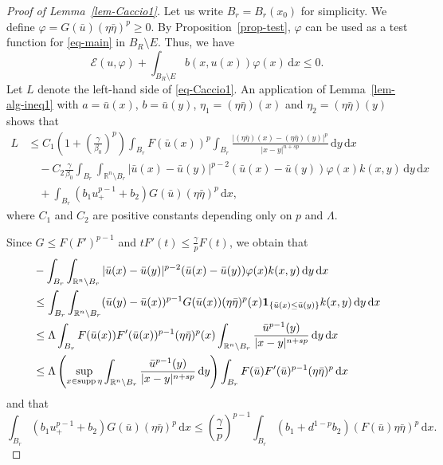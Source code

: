 \documentclass[11pt]{amsart}
\theoremstyle{plain}
\theoremstyle{definition}
\numberwithin{equation}{section}
\begin{document}
\begin{proof}[Proof of Lemma~\ref{lem-Caccio1}]
Let us write $B_r=B_r(x_0)$ for simplicity. We define $\varphi=G(\bar{u}) (\eta\bar{\eta})^p \geq 0$. 
By Proposition~\ref{prop-test}, $\varphi$ can be used as a test function for \eqref{eq-main} in $B_R \setminus E$. Thus, we have
\begin{equation*}
\mathcal{E}(u, \varphi) + \int_{B_R \setminus E} b(x, u(x)) \varphi(x) \,\mathrm{d}x \leq 0.
\end{equation*}
Let $L$ denote the left-hand side of \eqref{eq-Caccio1}. An application of Lemma~\ref{lem-alg-ineq1} with $a=\bar{u}(x)$, $b=\bar{u}(y)$, $\eta_1=(\eta\bar{\eta})(x)$ and $\eta_2=(\eta\bar{\eta})(y)$ shows that
\begin{equation*}
\begin{split}
L
&\leq C_1 \left( 1+\left( \frac{\gamma}{\beta_0} \right)^p \right) \int_{B_r} F(\bar{u}(x))^p \int_{B_r} \frac{|(\eta\bar{\eta})(x)-(\eta\bar{\eta})(y)|^p}{|x-y|^{n+sp}} \,\mathrm{d}y\,\mathrm{d}x \\
&\quad - C_2 \frac{\gamma}{\beta_0} \int_{B_r} \int_{\mathbb{R}^n \setminus B_r} |\bar{u}(x)-\bar{u}(y)|^{p-2} (\bar{u}(x)-\bar{u}(y)) \varphi(x) k(x, y) \,\mathrm{d}y \,\mathrm{d}x \\
&\quad + \int_{B_r} (b_1u_+^{p-1} + b_2) G(\bar{u})(\eta \bar{\eta})^p \,\mathrm{d}x,
\end{split}
\end{equation*}
where $C_1$ and $C_2$ are positive constants depending only on $p$ and $\Lambda$.

Since $G\leq F(F')^{p-1}$ and $tF'(t) \leq \frac{\gamma}{p}F(t)$, we obtain that
\begin{align*}
&-\int_{B_r} \int_{\mathbb{R}^n \setminus B_r} |\bar{u}(x)-\bar{u}(y)|^{p-2} (\bar{u}(x)-\bar{u}(y)) \varphi(x) k(x, y) \,\mathrm{d}y \,\mathrm{d}x \\
&\leq \int_{B_r} \int_{\mathbb{R}^n \setminus B_r} (\bar{u}(y)-\bar{u}(x))^{p-1} G(\bar{u}(x)) (\eta\bar{\eta})^p(x) {\bf 1}_{\lbrace \bar{u}(x) \leq \bar{u}(y) \rbrace} k(x, y) \,\mathrm{d}y \,\mathrm{d}x \\
&\leq \Lambda \int_{B_r} F(\bar{u}(x)) F'(\bar{u}(x))^{p-1} (\eta\bar{\eta})^p(x) \int_{\mathbb{R}^n \setminus B_r} \frac{\bar{u}^{p-1}(y)}{|x-y|^{n+sp}} \,\mathrm{d}y \,\mathrm{d}x \\
&\leq \Lambda \left( \sup_{x \in \mathrm{supp} \, \eta} \int_{\mathbb{R}^n \setminus B_r} \frac{\bar{u}^{p-1}(y)}{|x-y|^{n+sp}} \,\mathrm{d}y \right) \int_{B_r} F(\bar{u}) F'(\bar{u})^{p-1} (\eta\bar{\eta})^p \,\mathrm{d}x
\end{align*}
and that
\begin{equation*}
\int_{B_r} (b_1u_+^{p-1} + b_2) G(\bar{u})(\eta \bar{\eta})^p \,\mathrm{d}x \leq \left( \frac{\gamma}{p} \right)^{p-1} \int_{B_r} (b_1+d^{1-p}b_2) (F(\bar{u}) \eta\bar{\eta})^p \,\mathrm{d}x.
\end{equation*}


\end{proof}
\end{document}
